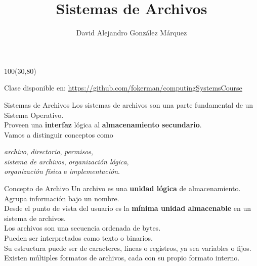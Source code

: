 \documentclass[aspectratio=169]{beamer}
\title{\Huge Sistemas de Archivos}
\author{David Alejandro González Márquez}
\date{}
\begin{document}
\begin{frame}[plain]
    \titlepage
    \begin{textblock}{100}(30,80)
    \begin{tcolorbox}[size=small,width=\textwidth,colback={gray!30},title={}]
    \begin{center}
     \scriptsize Clase disponible en: \url{https://github.com/fokerman/computingSystemsCourse}
    \end{center}
    \end{tcolorbox}
    \end{textblock}
\end{frame}

\begin{frame}[fragile]{Sistemas de Archivos}
    Los sistemas de archivos son una parte fundamental de un Sistema Operativo.\\
    \bigskip
    Proveen una \textbf{interfaz} lógica al \textbf{almacenamiento secundario}.\\
    \bigskip
    Vamos a distinguir conceptos como\\
    \begin{center}
    \emph{archivo}, \emph{directorio}, \emph{permisos},\\
    \bigskip
    \emph{sistema de archivos}, \emph{organización lógica},\\
    \bigskip
    \emph{organización física} e \emph{implementación}.
    \end{center}
\end{frame}

\begin{frame}[fragile]{Concepto de Archivo}
    Un archivo es una \textbf{unidad lógica} de almacenamiento. Agrupa información bajo un nombre.\\
    Desde el punto de vista del usuario es la \textbf{mínima unidad almacenable} en un sistema de archivos.\\
    \bigskip
    \pause
    Los archivos son una secuencia ordenada de bytes.\\
    Pueden ser interpretados como \textcolor{verdeuca}{texto} o \textcolor{verdeuca}{binarios}.\\
    Su estructura puede ser de caracteres, líneas o registros, ya sea variables o fijos.\\
    \bigskip
    Existen múltiples formatos de archivos, cada con su propio formato interno.
\end{frame}
\end{document}

